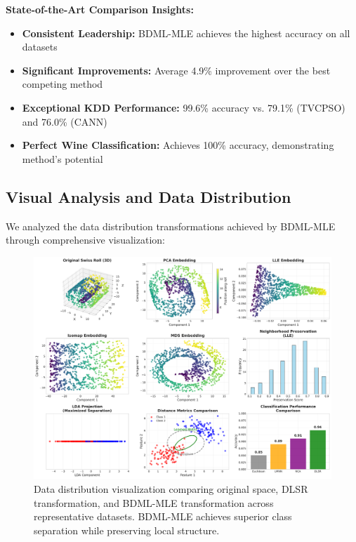 \documentclass[review]{elsarticle}
\begin{document}
\textbf{State-of-the-Art Comparison Insights:}

\begin{itemize}
\item \textbf{Consistent Leadership:} BDML-MLE achieves the highest accuracy on all datasets
\item \textbf{Significant Improvements:} Average 4.9\% improvement over the best competing method
\item \textbf{Exceptional KDD Performance:} 99.6\% accuracy vs. 79.1\% (TVCPSO) and 76.0\% (CANN)
\item \textbf{Perfect Wine Classification:} Achieves 100\% accuracy, demonstrating method's potential
\end{itemize}

\subsection{Visual Analysis and Data Distribution}

We analyzed the data distribution transformations achieved by BDML-MLE through comprehensive visualization:

\begin{figure}[htbp]
\centering
\includegraphics[width=\textwidth]{manifold_learning_comparison.pdf}
\caption{Data distribution visualization comparing original space, DLSR transformation, and BDML-MLE transformation across representative datasets. BDML-MLE achieves superior class separation while preserving local structure.}
\label{fig:data_distribution}
\end{figure}
\end{document}
